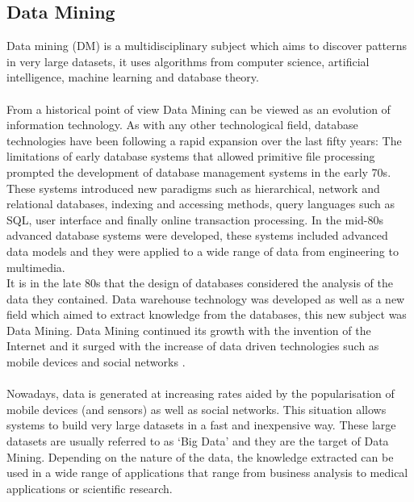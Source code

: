 \documentclass[11pt, oneside]{article}   	%
\begin{document}
\subsection{Data Mining}
Data mining (DM) is a multidisciplinary subject which aims to discover patterns in very large datasets, it uses algorithms from computer science, artificial intelligence, machine learning and database theory. %
\\\\
From a historical point of view Data Mining can be viewed as an evolution of information technology. As with any other technological field, database technologies have been following a rapid expansion over the last fifty years: The limitations of early database systems that allowed primitive file processing prompted the development of database management systems in the early 70s. These systems introduced new paradigms such as hierarchical, network and relational databases, indexing and accessing methods, query languages such as SQL, user interface and finally online transaction processing. In the mid-80s advanced database systems were developed, these systems included advanced data models and they were applied to a wide range of data from engineering to multimedia.\\ 
It is in the late 80s that the design of databases considered the analysis of the data they contained. Data warehouse technology was developed as well as a new field which aimed to extract knowledge from the databases, this new subject was Data Mining. Data Mining continued its growth with the invention of the Internet and it surged with the increase of data driven technologies such as mobile devices and social networks \cite{Han:2005:DMC:1076797}.\\\\
Nowadays, data is generated at increasing rates aided by the popularisation of mobile devices (and sensors) as well as social networks. This situation allows systems to build very large datasets in a fast and inexpensive way. These large datasets are usually referred to as `Big Data' and they are the target of Data Mining. Depending on the nature of the data, the knowledge extracted can be used in a wide range of applications that range from business analysis to medical applications or scientific research.\\\\
\end{document}
